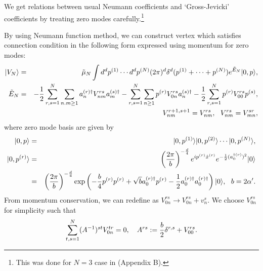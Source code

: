 \documentclass[12pt,a4paper]{article}
\begin{document}
We get relations between usual Neumann coefficients and `Gross-Jevicki' coefficients by treating zero modes carefully.\footnote{
This was done for $N=3$ case in \cite{RSZ0102} (Appendix B).
}

By using Neumann function method, we can construct vertex which satisfies connection condition in the following form expressed using momentum for zero modes:
\begin{eqnarray}
\label{eqn:NEU}
|V_N\rangle&=&{\tilde \mu}_N \int d^dp^{(1)}\cdots d^dp^{(N)} (2\pi)^d\delta^d(p^{(1)}+\cdots+p^{(N)})e^{{\tilde E}_N}|0,p\rangle,\nonumber \\
{\tilde E}_N&=&-{1\over2}\sum_{r,s=1}^N \sum_{n.m\geq1}a^{(r)\dagger}_nV^{rs}_{nm}a^{(s)\dagger}_m-\sum_{r,s=1}^N \sum_{n\geq1}p^{(r)}V^{rs}_{0n}a_n^{(s)\dagger}-{1\over2}\sum_{r,s=1}^Np^{(r)}V^{rs}_{00}p^{(s)},\nonumber \\
&&V^{r+1,s+1}_{nm}=V^{rs}_{nm},\ \ V^{rs}_{nm}=V^{sr}_{mn},
\end{eqnarray}
where zero mode basis are given by 
\begin{eqnarray}
|0,p\rangle&=&|0,p^{(1)}\rangle|0,p^{(2)}\rangle\cdots|0,p^{(N)}\rangle,\nonumber \\
|0,p^{(r)}\rangle&=&\left({2\pi\over b}\right)^{-{d\over4}}e^{ip^{(r)}{\hat x}^{(r)}}e^{-{1\over2}(a_0^{\dagger(r)})^2}|0\rangle\nonumber \\
&=&\left({2\pi\over b}\right)^{-{d\over4}}\exp\left(-{b\over4}p^{(r)}p^{(r)}+\sqrt b a_0^{(r)\dagger}p^{(r)}-{1\over2}a_0^{(r)\dagger}a_0^{(r)\dagger}\right)|0\rangle,\ \ b=2\alpha'.
\end{eqnarray}
From momentum conservation, we can redefine as $V^{rs}_{0n}\rightarrow V^{rs}_{0n}+v_n^s$.
We choose $V^{rs}_{0n}$ for simplicity such that
\begin{equation}
\sum_{t,s=1}^N (A^{-1})^{st}V_{0n}^{tr}=0,\ \ \ A^{rs}:={b\over2}\delta^{r,s}+V_{00}^{rs}.
\end{equation}
\end{document}

